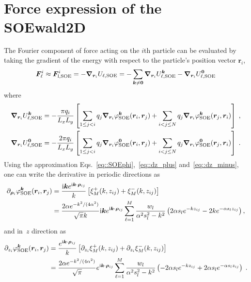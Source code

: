 \section{Force expression of the SOEwald2D} \label{app::force}

The Fourier component of force acting on the $i$th particle can be evaluated by taking the gradient of the energy with respect to the particle's position vector $\bm{r}_{i}$,
\begin{equation}\label{eq::Fi}
	\boldsymbol{F}_{\ell}^i  \approx \boldsymbol{F}^{i}_{\text{l},\text{SOE}} = -\boldsymbol{\nabla}_{\boldsymbol{r}_{i}} U_{\ell,\text{SOE}} =  -\sum_{\bm{k}\neq \bm{0}} \boldsymbol{\nabla}_{\boldsymbol{r}_{i}}U_{\ell,\text{SOE}}^{\boldsymbol{k}} -\boldsymbol{\nabla}_{\boldsymbol{r}_{i}} U_{\ell,\text{SOE}}^{\boldsymbol{0}}
\end{equation}
where
\begin{align}    
	\boldsymbol{\nabla}_{\boldsymbol{r}_{i}}U_{\ell,\text{SOE}}^{\boldsymbol{k}} &= - \frac{\pi q_{i}}{L_x L_y} \left[ \sum_{1 \leq j < i} q_{j} \boldsymbol{\nabla}_{\boldsymbol{r}_{i}} \varphi_{\text{SOE}}^{\boldsymbol{k}}(\boldsymbol{r}_{i}, \boldsymbol{r}_{j}) +  \sum_{i < j \leq N} q_{j} \boldsymbol{\nabla}_{\boldsymbol{r}_{i}} \varphi_{\text{SOE}}^{\boldsymbol{k}}(\boldsymbol{r}_{j}, \boldsymbol{r}_{i}) \right]\;,\\
	\boldsymbol{\nabla}_{\boldsymbol{r}_{i}} U_{\ell,\text{SOE}}^{\boldsymbol{0}} &= - \frac{2 \pi q_{i}}{L_x L_y} \left[ \sum_{1 \leq j < i} q_{j} \boldsymbol{\nabla}_{\boldsymbol{r}_{i}} \varphi^{\bm{0}}_{\text{SOE}}(\bm{r}_{i}, \bm{r}_{j}) + \sum_{i < j \leq N} q_{j} \boldsymbol{\nabla}_{\boldsymbol{r}_{i}} \varphi^{\bm{0}}_{\text{SOE}}(\bm{r}_{j}, \bm{r}_{i})\right]\;.
\end{align}
Using the approximation Eqs.~\eqref{eq::SOEphi},~\eqref{eq::dz_plus} and~\eqref{eq::dz_minus}, one can write the derivative in periodic directions as
\begin{equation}
	\begin{split}
		\partial_{\bm{\rho}_{i}} \varphi_{\text{SOE}}^{\boldsymbol{k}}(\boldsymbol{r}_{i}, \boldsymbol{r}_{j}) & = \frac{\mathrm{i} \boldsymbol{k} e^{ \mathrm{i} \boldsymbol{k} \cdot \boldsymbol{\rho}_{ij}}}{k} \left[\xi^{+}_M(k, z_{ij})+\xi^{-}_M(k, z_{ij})\right]\\
		&=\frac{2\alpha e^{-k^2/(4\alpha^2)}}{\sqrt{\pi}k} \mathrm{i} \bm{k}e^{\mathrm{i} \boldsymbol{k} \cdot \boldsymbol{\rho}_{ij}} \sum_{\ell = 1}^{M}  \frac{w_l}{\alpha^2 s_l^2 - k^2}\left( 2 \alpha s_l e^{-k z_{ij}} - 2 k e^{-\alpha s_l z_{ij}}\right),
	\end{split}
\end{equation}
and in~$z$ direction as
\begin{equation}\label{eq:z-der}
	\begin{split}
		\partial_{z_{i}} \varphi_{\text{SOE}}^{\boldsymbol{k}}(\boldsymbol{r}_{i}, \boldsymbol{r}_{j}) & = \frac{e^{\mathrm{i} \boldsymbol{k} \cdot \boldsymbol{\rho}_{ij}}}{k} \left[\partial_{z_{i}} \xi^{+}_M(k, z_{ij}) + \partial_{z_{i}} \xi^{-}_M(k, z_{ij})\right]\\
		&=\frac{2 \alpha e^{-k^2/(4\alpha^2)}}{\sqrt{\pi}}e^{ \mathrm{i} \boldsymbol{k} \cdot \boldsymbol{\rho}_{ij}} \sum_{\ell = 1}^{M}  \frac{w_l}{\alpha^2 s_l^2 - k^2}\left( - 2 \alpha s_l e^{-k z_{ij}} + 2 \alpha s_l e^{- \alpha s_l z_{ij}}\right)\;.
	\end{split}
\end{equation}
